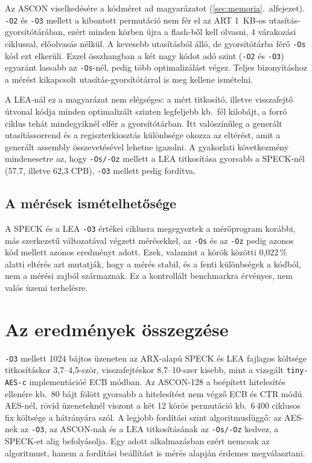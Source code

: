 \documentclass[a4paper,12pt]{report}
\theoremstyle{definition}
\theoremstyle{remark}
\begin{document}
Az ASCON viselkedésére a kódméret ad magyarázatot (\ref{sec:memoria}.~alfejezet). \texttt{-O2} és \texttt{-O3} mellett a kibontott permutáció nem fér el az ART 1~KB-os utasítás-gyorsítótárában, ezért minden körben újra a flash-ből kell olvasni, 4 várakozási ciklussal, előolvasás nélkül. A kevesebb utasításból álló, de gyorsítótárba férő \texttt{-Os} kód ezt elkerüli. Ezzel összhangban a két nagy kódot adó szint (\texttt{-O2} és \texttt{-O3}) egyaránt lassabb az \texttt{-Os}-nél, pedig több optimalizálást végez. Teljes bizonyításhoz a mérést kikapcsolt utasítás-gyorsítótárral is meg kellene ismételni.

A LEA-nál ez a magyarázat nem elégséges: a mért titkosító, illetve visszafejtő útvonal kódja minden optimalizált szinten legfeljebb kb.\ fél kilobájt, a forró ciklus tehát mindegyiknél elfér a gyorsítótárban. Itt valószínűleg a generált utasítássorrend és a regiszterkiosztás különbsége okozza az eltérést, amit a generált assembly összevetésével lehetne igazolni. A gyakorlati következmény mindenesetre az, hogy \texttt{-Os/-Oz} mellett a LEA titkosítása gyorsabb a SPECK-nél (57,7, illetve 62,3 CPB), \texttt{-O3} mellett pedig fordítva.

\subsection{A mérések ismételhetősége}

A SPECK és a LEA \texttt{-O3} értékei ciklusra megegyeztek a mérőprogram korábbi, más szerkezetű változatával végzett mérésekkel, az \texttt{-Os} és az \texttt{-Oz} pedig azonos kód mellett azonos eredményt adott. Ezek, valamint a körök közötti 0,022\,\% alatti eltérés azt mutatják, hogy a mérés stabil, és a fenti különbségek a kódból, nem a mérési zajból származnak. Ez a kontrollált benchmarkra érvényes, nem valós üzemi terhelésre.

\section{Az eredmények összegzése}\label{sec:osszesites}

\texttt{-O3} mellett 1024 bájtos üzeneten az ARX-alapú SPECK és LEA fajlagos költsége titkosításkor 3,7--4,5-ször, visszafejtéskor 8,7--10-szer kisebb, mint a vizsgált \texttt{tiny-AES-c} implementációé ECB módban. Az ASCON-128 a beépített hitelesítés ellenére kb.\ 80 bájt fölött gyorsabb a hitelesítést nem végző ECB és CTR módú AES-nél, rövid üzeneteknél viszont a két 12 körös permutáció kb.\ 6\,400 ciklusos fix költsége a hátrányára szól. A legjobb fordítási szint algoritmusfüggő: az AES-nek az \texttt{-O3}, az ASCON-nak és a LEA titkosításának az \texttt{-Os/-Oz} kedvez, a SPECK-et alig befolyásolja. Egy adott alkalmazásban ezért nemcsak az algoritmust, hanem a fordítási beállítást is mérés alapján érdemes megválasztani.
\end{document}

